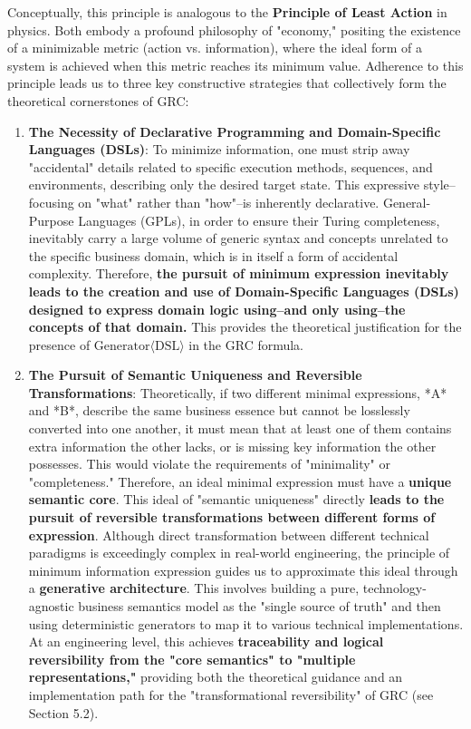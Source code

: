 \documentclass[11pt]{article}
\begin{document}
Conceptually, this principle is analogous to the \textbf{Principle of Least Action} in physics. Both embody a profound philosophy of "economy," positing the existence of a minimizable metric (action vs. information), where the ideal form of a system is achieved when this metric reaches its minimum value. Adherence to this principle leads us to three key constructive strategies that collectively form the theoretical cornerstones of GRC:
\begin{enumerate}
    \item \textbf{The Necessity of Declarative Programming and Domain-Specific Languages (DSLs)}: To minimize information, one must strip away "accidental" details related to specific execution methods, sequences, and environments, describing only the desired target state. This expressive style--focusing on "what" rather than "how"--is inherently declarative. General-Purpose Languages (GPLs), in order to ensure their Turing completeness, inevitably carry a large volume of generic syntax and concepts unrelated to the specific business domain, which is in itself a form of accidental complexity. Therefore, \textbf{the pursuit of minimum expression inevitably leads to the creation and use of Domain-Specific Languages (DSLs) designed to express domain logic using--and only using--the concepts of that domain.} This provides the theoretical justification for the presence of $\text{Generator}\langle\text{DSL}\rangle$ in the GRC formula.
    \item \textbf{The Pursuit of Semantic Uniqueness and Reversible Transformations}: Theoretically, if two different minimal expressions, *A* and *B*, describe the same business essence but cannot be losslessly converted into one another, it must mean that at least one of them contains extra information the other lacks, or is missing key information the other possesses. This would violate the requirements of "minimality" or "completeness." Therefore, an ideal minimal expression must have a \textbf{unique semantic core}. This ideal of "semantic uniqueness" directly \textbf{leads to the pursuit of reversible transformations between different forms of expression}. Although direct transformation between different technical paradigms is exceedingly complex in real-world engineering, the principle of minimum information expression guides us to approximate this ideal through a \textbf{generative architecture}. This involves building a pure, technology-agnostic business semantics model as the "single source of truth" and then using deterministic generators to map it to various technical implementations. At an engineering level, this achieves \textbf{traceability and logical reversibility from the "core semantics" to "multiple representations,"} providing both the theoretical guidance and an implementation path for the "transformational reversibility" of GRC (see Section 5.2).

\end{enumerate}
\end{document}
